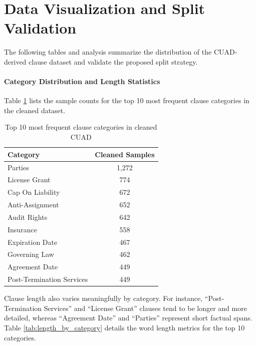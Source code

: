 \documentclass[12pt, a4paper]{report}
\begin{document}
\section{Data Visualization and Split Validation}
The following tables and analysis summarize the distribution of the CUAD-derived clause dataset and validate the proposed split strategy.

\paragraph{Category Distribution and Length Statistics}
Table \ref{tab:top_categories} lists the sample counts for the top 10 most frequent clause categories in the cleaned dataset.

\begin{table}[h]
\centering
\small
\begin{tabular}{lc}
\toprule
Category & Cleaned Samples \\
\hline
Parties & 1,272 \\
License Grant & 774 \\
Cap On Liability & 672 \\
Anti-Assignment & 652 \\
Audit Rights & 642 \\
Insurance & 558 \\
Expiration Date & 467 \\
Governing Law & 462 \\
Agreement Date & 449 \\
Post-Termination Services & 449 \\
\bottomrule
\end{tabular}
\caption{Top 10 most frequent clause categories in cleaned CUAD}
\label{tab:top_categories}
\end{table}

Clause length also varies meaningfully by category. For instance, ``Post-Termination Services'' and ``License Grant'' clauses tend to be longer and more detailed, whereas ``Agreement Date'' and ``Parties'' represent short factual spans. Table \ref{tab:length_by_category} details the word length metrics for the top 10 categories.
\end{document}
